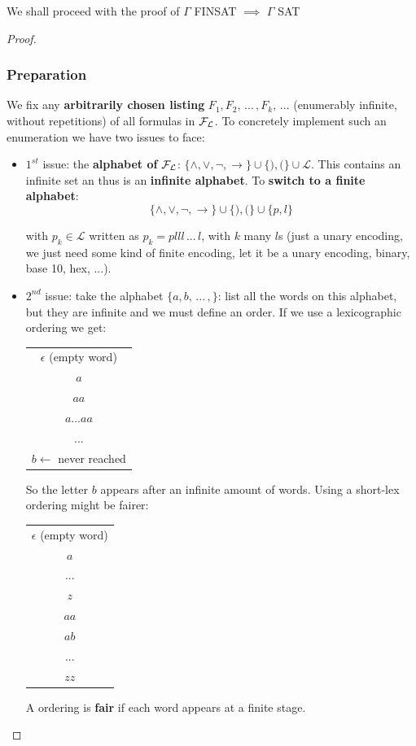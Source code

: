 	\noindent
	We shall proceed with the proof of $\Gamma$ FINSAT $\implies$ $\Gamma$ SAT
	\begin{proof} \hspace{1cm} \vspace{-0.5cm}
	  \subsubsection{Preparation}
		We fix any \textbf{arbitrarily chosen listing} $F_1, F_2, \, ... \, , F_k , \, ...$ (enumerably infinite, without repetitions) of all formulas in $\mathcal{F}_\mathcal{L}$. To concretely implement such an enumeration we have two issues to face:

		\begin{itemize}
			 \item $1^{st}$ issue: the \textbf{alphabet of} $\mathcal{F}_\mathcal{L}$: $\{\wedge, \vee, \neg, \rightarrow\} \cup \{),(\} \cup \mathcal{L}$. This contains an infinite set an thus is an \textbf{infinite alphabet}. To \textbf{switch to a finite alphabet}:
			$$ \{\wedge, \vee, \neg, \rightarrow\} \cup \{),(\} \cup \{p,l\} $$

			with $p_k \in \mathcal{L}$ written as $p_k = plll \, ... \, l$, with $k$ many $l$s (just a unary encoding, we just need some kind of finite encoding, let it be a unary encoding, binary, base 10, hex, ...).\\


			\item $2^{nd}$ issue: take the alphabet $\{a,b, \, ... \, , \}$: list all the words on this alphabet, but they are infinite and we must define an order. If we use a lexicographic ordering we get:

			\begin{center}
				\begin{tabular}{| c |}
					\hline
					$\epsilon$ (empty word)\\
					$a$\\
					$aa$\\
					$a...aa$\\
					...\\
					$b \leftarrow$ never reached\\
					\hline
				\end{tabular}
			\end{center}

			So the letter $b$ appears after an infinite amount of words. Using a short-lex ordering might be fairer:
			\begin{center}
				\begin{tabular}{| c |}
					\hline
					$\epsilon$ (empty word)\\
					$a$\\
					... \\
					$z$ \\
					$aa$\\
					$ab$\\
					...\\
					$zz$\\
					\hline
				\end{tabular}
			\end{center}
			A ordering is \textbf{fair} if each word appears at a finite stage.
		\end{itemize}


\end{proof}
